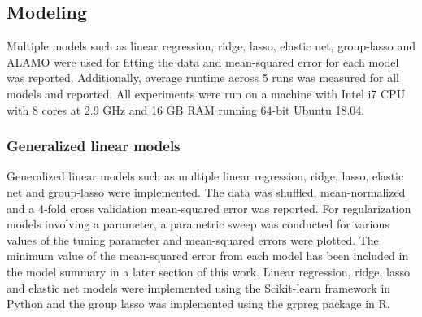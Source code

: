 \documentclass[a4paper,12pt]{article}
\begin{document}
\newpage
\subsection{Modeling}
    Multiple models such as linear regression, ridge, lasso, elastic net, group-lasso and ALAMO were used for fitting the data and mean-squared error for each model was reported. Additionally, average runtime across 5 runs was measured for all models and reported. All experiments were run on a machine with Intel i7 CPU with 8 cores at 2.9 GHz and 16 GB RAM running 64-bit Ubuntu 18.04.
    \subsubsection{Generalized linear models}
    Generalized linear models such as multiple linear regression, ridge, lasso, elastic net and group-lasso were implemented. The data was shuffled, mean-normalized and a 4-fold cross validation mean-squared error was reported. For regularization models involving a parameter, a parametric sweep was conducted for various values of the tuning parameter and mean-squared errors were plotted. The minimum value of the mean-squared error from each model has been included in the model summary in a later section of this work. Linear regression, ridge, lasso and elastic net models were implemented using the Scikit-learn\cite{scikit-learn} framework in Python and the group lasso was implemented using the grpreg\cite{breheny2015group} package in R.
\end{document}

